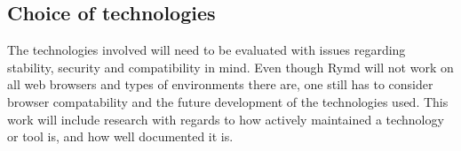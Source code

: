 \subsection{Choice of technologies}
The technologies involved will need to be evaluated with issues regarding stability, security and compatibility in mind. Even though Rymd will not work on all web browsers and types of environments there are, one still has to consider browser compatability and the future development of the technologies used. This work will include research with regards to how actively maintained a technology or tool is, and how well documented it is. 
























